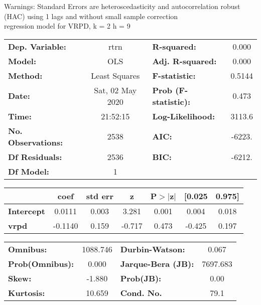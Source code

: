 Warnings: \newline
 [1] Standard Errors are heteroscedasticity and autocorrelation robust (HAC) using 1 lags and without small sample correction\\ 

regression model for VRPD, k = 2 h = 9\begin{center}
\begin{tabular}{lclc}
\toprule
\textbf{Dep. Variable:}    &       rtrn       & \textbf{  R-squared:         } &     0.000   \\
\textbf{Model:}            &       OLS        & \textbf{  Adj. R-squared:    } &     0.000   \\
\textbf{Method:}           &  Least Squares   & \textbf{  F-statistic:       } &    0.5144   \\
\textbf{Date:}             & Sat, 02 May 2020 & \textbf{  Prob (F-statistic):} &    0.473    \\
\textbf{Time:}             &     21:52:15     & \textbf{  Log-Likelihood:    } &    3113.6   \\
\textbf{No. Observations:} &        2538      & \textbf{  AIC:               } &    -6223.   \\
\textbf{Df Residuals:}     &        2536      & \textbf{  BIC:               } &    -6212.   \\
\textbf{Df Model:}         &           1      & \textbf{                     } &             \\
\bottomrule
\end{tabular}
\begin{tabular}{lcccccc}
                   & \textbf{coef} & \textbf{std err} & \textbf{z} & \textbf{P$> |$z$|$} & \textbf{[0.025} & \textbf{0.975]}  \\
\midrule
\textbf{Intercept} &       0.0111  &        0.003     &     3.281  &         0.001        &        0.004    &        0.018     \\
\textbf{vrpd}      &      -0.1140  &        0.159     &    -0.717  &         0.473        &       -0.425    &        0.197     \\
\bottomrule
\end{tabular}
\begin{tabular}{lclc}
\textbf{Omnibus:}       & 1088.746 & \textbf{  Durbin-Watson:     } &    0.067  \\
\textbf{Prob(Omnibus):} &   0.000  & \textbf{  Jarque-Bera (JB):  } & 7697.683  \\
\textbf{Skew:}          &  -1.880  & \textbf{  Prob(JB):          } &     0.00  \\
\textbf{Kurtosis:}      &  10.659  & \textbf{  Cond. No.          } &     79.1  \\
\bottomrule
\end{tabular}
\end{center}


